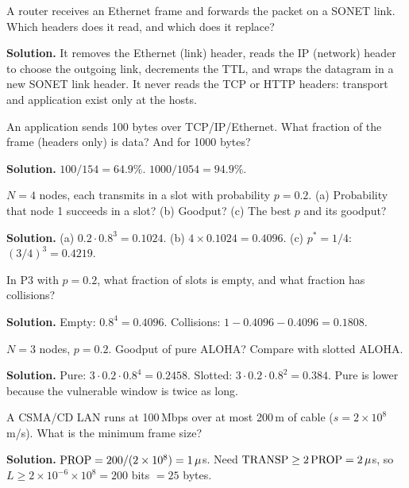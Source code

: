 \begin{example}[P1: Layers]
A router receives an Ethernet frame and forwards the packet on a SONET link. Which headers does it read, and which does it replace?

\textbf{Solution.} It removes the Ethernet (link) header, reads the IP (network) header to choose the outgoing link, decrements the TTL, and wraps the datagram in a new
SONET link header. It never reads the TCP or HTTP headers: transport and application exist only at the hosts.
\end{example}

\begin{example}
An application sends 100 bytes over TCP/IP/Ethernet. What fraction of the frame (headers only) is data? And for 1000 bytes?

\textbf{Solution.} $100/154=64.9\%$. $1000/1054=94.9\%$.
\end{example}

\begin{example}
$N=4$ nodes, each transmits in a slot with probability $p=0.2$. (a) Probability that node 1 succeeds in a slot? (b) Goodput? (c) The best $p$ and its goodput?

\textbf{Solution.} (a) $0.2\cdot0.8^3=0.1024$. (b) $4\times0.1024=0.4096$. (c) $p^*=1/4$: $(3/4)^3=0.4219$.
\end{example}

\begin{example}
In P3 with $p=0.2$, what fraction of slots is empty, and what fraction has collisions?

\textbf{Solution.} Empty: $0.8^4=0.4096$. Collisions: $1-0.4096-0.4096=0.1808$.
\end{example}

\begin{example}
$N=3$ nodes, $p=0.2$. Goodput of pure ALOHA? Compare with slotted ALOHA.

\textbf{Solution.} Pure: $3\cdot0.2\cdot0.8^{4}=0.2458$. Slotted: $3\cdot0.2\cdot0.8^{2}=0.384$. Pure is lower because the vulnerable window is twice as long.
\end{example}

\begin{example}
A CSMA/CD LAN runs at 100\,Mbps over at most 200\,m of cable ($s=2\times10^8$\,m/s). What is the minimum frame size?

\textbf{Solution.} $\text{PROP}=200/(2\times10^8)=1\,\mu$s. Need $\text{TRANSP}\ge2\,\text{PROP}=2\,\mu$s, so $L\ge2\times10^{-6}\times10^8=200$ bits $=25$ bytes.
\end{example}

